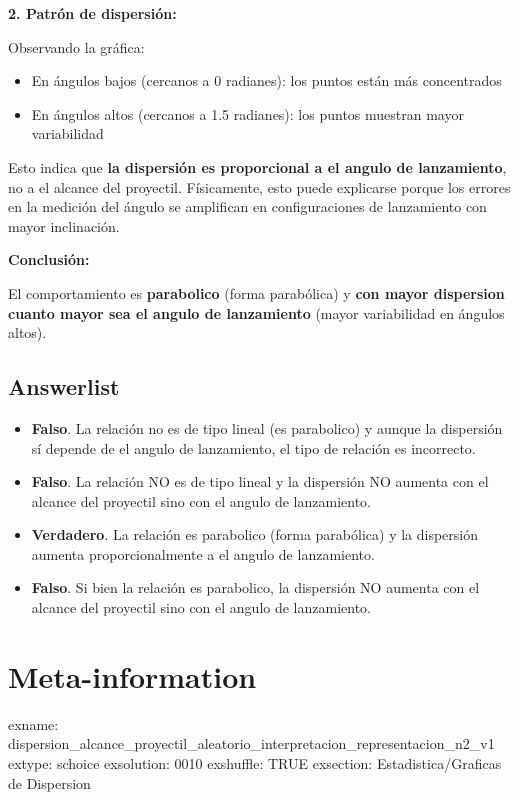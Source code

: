 \documentclass[
]{article}
\providecommand{\tightlist}{%
  \setlength{\itemsep}{0pt}\setlength{\parskip}{0pt}}
\begin{document}
\textbf{2. Patrón de dispersión:}

Observando la gráfica:

\begin{itemize}
\tightlist
\item
  En ángulos bajos (cercanos a 0 radianes): los puntos están más
  concentrados
\item
  En ángulos altos (cercanos a 1.5 radianes): los puntos muestran mayor
  variabilidad
\end{itemize}

Esto indica que \textbf{la dispersión es proporcional a el angulo de
lanzamiento}, no a el alcance del proyectil. Físicamente, esto puede
explicarse porque los errores en la medición del ángulo se amplifican en
configuraciones de lanzamiento con mayor inclinación.

\textbf{Conclusión:}

El comportamiento es \textbf{parabolico} (forma parabólica) y
\textbf{con mayor dispersion cuanto mayor sea el angulo de lanzamiento}
(mayor variabilidad en ángulos altos).

\subsection{Answerlist}\label{answerlist-1}

\begin{itemize}
\tightlist
\item
  \textbf{Falso}. La relación no es de tipo lineal (es parabolico) y
  aunque la dispersión sí depende de el angulo de lanzamiento, el tipo
  de relación es incorrecto.
\item
  \textbf{Falso}. La relación NO es de tipo lineal y la dispersión NO
  aumenta con el alcance del proyectil sino con el angulo de
  lanzamiento.
\item
  \textbf{Verdadero}. La relación es parabolico (forma parabólica) y la
  dispersión aumenta proporcionalmente a el angulo de lanzamiento.
\item
  \textbf{Falso}. Si bien la relación es parabolico, la dispersión NO
  aumenta con el alcance del proyectil sino con el angulo de
  lanzamiento.
\end{itemize}

\section{Meta-information}\label{meta-information}

exname:
dispersion\_alcance\_proyectil\_aleatorio\_interpretacion\_representacion\_n2\_v1
extype: schoice exsolution: 0010 exshuffle: TRUE exsection:
Estadistica/Graficas de Dispersion
\end{document}
